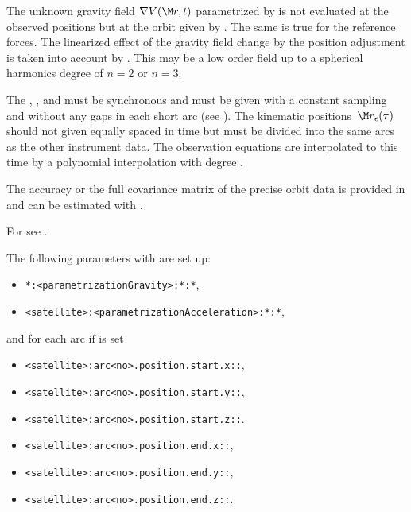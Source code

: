The unknown gravity field $\nabla V(\M r, t)$ parametrized by 
is not evaluated at the observed positions but at the orbit given by .
The same is true for the reference forces. The linearized effect of the gravity field change by the position
adjustment is taken into account by . This may be a low order field up to a
spherical harmonics degree of $n=2$ or $n=3$.

The , , and 
must be synchronous and must be given with a constant sampling and without any gaps in each short arc
(see ).
The kinematic positions~${\M r}_\epsilon(\tau)$ should not given equally spaced in time
but must be divided into the same arcs as the other instrument data.
The observation equations are interpolated to this time by a polynomial interpolation
with degree .

The accuracy or the full covariance matrix of the precise orbit data is provided in
 and can be estimated with .

For  see .

The following parameters with  are set up:
\begin{itemize}
\item \verb|*:<parametrizationGravity>:*:*|,
\item \verb|<satellite>:<parametrizationAcceleration>:*:*|,
\end{itemize}
and for each arc if  is set
\begin{itemize}
\item \verb|<satellite>:arc<no>.position.start.x::|,
\item \verb|<satellite>:arc<no>.position.start.y::|,
\item \verb|<satellite>:arc<no>.position.start.z::|.
\item \verb|<satellite>:arc<no>.position.end.x::|,
\item \verb|<satellite>:arc<no>.position.end.y::|,
\item \verb|<satellite>:arc<no>.position.end.z::|.
\end{itemize}


